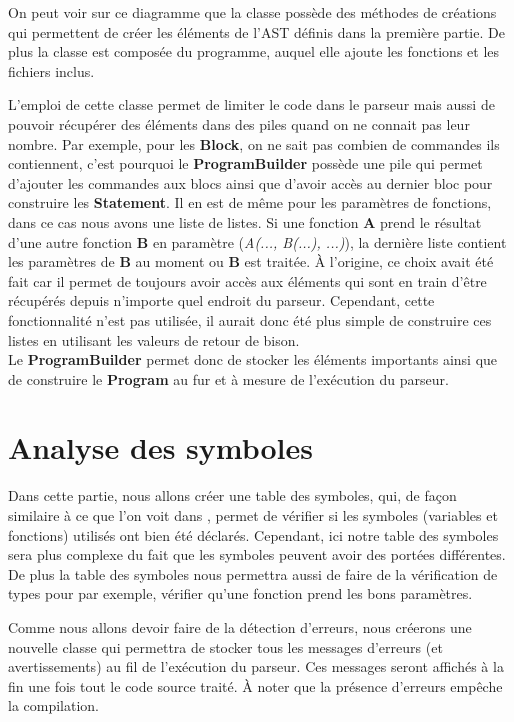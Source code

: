 \documentclass[a4paper]{article}%
\begin{document}
On peut voir sur ce diagramme que la classe possède des méthodes de créations
qui permettent de créer les éléments de l'AST définis dans la première partie.
De plus la classe est composée du programme, auquel elle ajoute les fonctions et
les fichiers inclus. %

L'emploi de cette classe permet de limiter le code dans le parseur mais aussi de
pouvoir récupérer des éléments dans des piles quand on ne connait pas leur
nombre. Par exemple, pour les \textbf{Block}, on ne sait pas combien de
commandes ils contiennent, c'est pourquoi le \textbf{ProgramBuilder} possède une
pile qui permet d'ajouter les commandes aux blocs ainsi que d'avoir accès au
dernier bloc pour construire les \textbf{Statement}. Il en est de même pour
les paramètres de fonctions, dans ce cas nous avons une liste de listes. Si une
fonction \textbf{A} prend le résultat d'une autre fonction \textbf{B} en
paramètre (\textit{A(..., B(...), ...)}), la dernière liste contient les
paramètres de \textbf{B} au moment ou \textbf{B} est traitée. À l'origine, ce
choix avait été fait car il permet de toujours avoir accès aux éléments qui sont
en train d'être récupérés depuis n'importe quel endroit du parseur. Cependant,
cette fonctionnalité n'est pas utilisée, il aurait donc été plus simple de
construire ces listes en utilisant les valeurs de retour de bison.\\

Le \textbf{ProgramBuilder} permet donc de stocker les éléments importants ainsi
que de construire le \textbf{Program} au fur et à mesure de l'exécution du
parseur.


\section{Analyse des symboles}

Dans cette partie, nous allons créer une table des symboles, qui, de façon
similaire à ce que l'on voit dans \cite{compilerFlexBison}, permet de vérifier
si les symboles (variables et fonctions) utilisés ont bien été déclarés.
Cependant, ici notre table des symboles sera plus complexe du fait que les
symboles peuvent avoir des portées différentes. De plus la table des symboles
nous permettra aussi de faire de la vérification de types pour par exemple,
vérifier qu'une fonction prend les bons paramètres.

Comme nous allons devoir faire de la détection d'erreurs, nous créerons une
nouvelle classe qui permettra de stocker tous les messages d'erreurs (et
avertissements) au fil de l'exécution du parseur. Ces messages seront affichés à
la fin une fois tout le code source traité. À noter que la présence d'erreurs
empêche la compilation.
\end{document}
